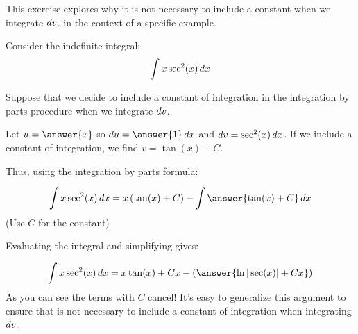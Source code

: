 \documentclass{ximera}
\author{Jim Talamo}
\begin{document}
\begin{exercise}
This exercise explores why it is not necessary to include a constant when we integrate $\mathop{}\!d v$. in the context of a specific example.

Consider the indefinite integral:
\[
\int x \sec^2(x) \mathop{}\!d x 
\]

Suppose that we decide to include a constant of integration in the integration by parts procedure when we integrate $\mathop{}\!d v$.

Let $u=\answer{x}$ so $\d u =\answer{1} \d x$ and $\mathop{}\!d v = \sec^2(x) \mathop{}\!d x$.  If we include a constant of integration, we find $v = \tan(x)+C$.

Thus, using the integration by parts formula:

\[
\int x \sec^2(x) \d x = x \left( \tan(x) +C \right) - \int \answer{\tan(x) +C} \d x
\]
(Use $C$ for the constant)

\begin{exercise}

Evaluating the integral and simplifying gives:

\[
\int x \sec^2(x) \d x = x \tan(x) +Cx - \left(\answer{\ln|\sec(x)| + Cx}\right)
\]
As you can see the terms with $C$ cancel!  It's easy to generalize this argument to ensure that is not necessary to include a constant of integration when integrating $\mathop{}\!d v$.

\end{exercise}
\end{exercise}
\end{document}
